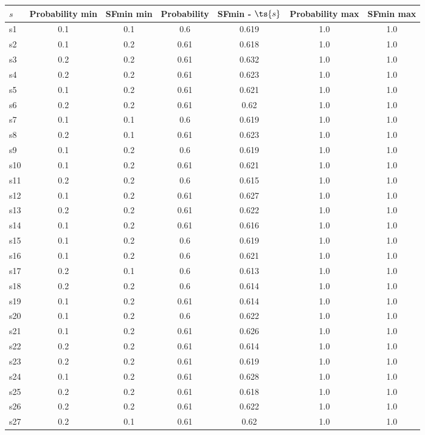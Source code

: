\documentclass{article}
\begin{document}
\noindent\begin{tabular}{|l|c|c|c|c|c|c|}
\hline
$s$& Probability min & SFmin min & Probability & SFmin - $\ts{s}$ & Probability max & SFmin max\\
\hline
s1 &0.1 & 0.1 & 0.6 & 0.619 & 1.0 & 1.0\\
\hline
s2 &0.1 & 0.2 & 0.61 & 0.618 & 1.0 & 1.0\\
\hline
s3 &0.2 & 0.2 & 0.61 & 0.632 & 1.0 & 1.0\\
\hline
s4 &0.2 & 0.2 & 0.61 & 0.623 & 1.0 & 1.0\\
\hline
s5 &0.1 & 0.2 & 0.61 & 0.621 & 1.0 & 1.0\\
\hline
s6 &0.2 & 0.2 & 0.61 & 0.62 & 1.0 & 1.0\\
\hline
s7 &0.1 & 0.1 & 0.6 & 0.619 & 1.0 & 1.0\\
\hline
s8 &0.2 & 0.1 & 0.61 & 0.623 & 1.0 & 1.0\\
\hline
s9 &0.1 & 0.2 & 0.6 & 0.619 & 1.0 & 1.0\\
\hline
s10 &0.1 & 0.2 & 0.61 & 0.621 & 1.0 & 1.0\\
\hline
s11 &0.2 & 0.2 & 0.6 & 0.615 & 1.0 & 1.0\\
\hline
s12 &0.1 & 0.2 & 0.61 & 0.627 & 1.0 & 1.0\\
\hline
s13 &0.2 & 0.2 & 0.61 & 0.622 & 1.0 & 1.0\\
\hline
s14 &0.1 & 0.2 & 0.61 & 0.616 & 1.0 & 1.0\\
\hline
s15 &0.1 & 0.2 & 0.6 & 0.619 & 1.0 & 1.0\\
\hline
s16 &0.1 & 0.2 & 0.6 & 0.621 & 1.0 & 1.0\\
\hline
s17 &0.2 & 0.1 & 0.6 & 0.613 & 1.0 & 1.0\\
\hline
s18 &0.2 & 0.2 & 0.6 & 0.614 & 1.0 & 1.0\\
\hline
s19 &0.1 & 0.2 & 0.61 & 0.614 & 1.0 & 1.0\\
\hline
s20 &0.1 & 0.2 & 0.6 & 0.622 & 1.0 & 1.0\\
\hline
s21 &0.1 & 0.2 & 0.61 & 0.626 & 1.0 & 1.0\\
\hline
s22 &0.2 & 0.2 & 0.61 & 0.614 & 1.0 & 1.0\\
\hline
s23 &0.2 & 0.2 & 0.61 & 0.619 & 1.0 & 1.0\\
\hline
s24 &0.1 & 0.2 & 0.61 & 0.628 & 1.0 & 1.0\\
\hline
s25 &0.2 & 0.2 & 0.61 & 0.618 & 1.0 & 1.0\\
\hline
s26 &0.2 & 0.2 & 0.61 & 0.622 & 1.0 & 1.0\\
\hline
s27 &0.2 & 0.1 & 0.61 & 0.62 & 1.0 & 1.0\\

\end{tabular}
\end{document}

